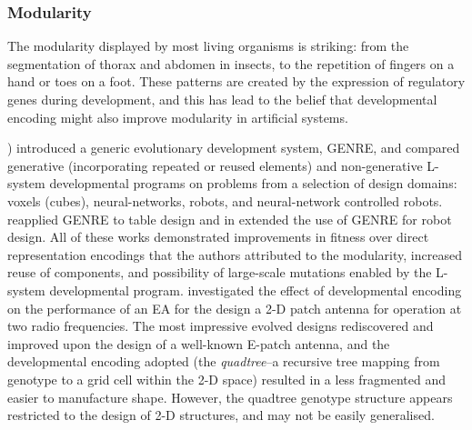 \subsubsection{Modularity}
The modularity displayed by most living organisms is striking: from the segmentation of thorax and abdomen in insects, to the repetition of fingers on a hand or toes on a foot.  These patterns are created by the expression of regulatory genes during development, and this has lead to the belief that developmental encoding might also improve modularity in artificial systems. 

\cite{Hornby:2003jt}) introduced a generic evolutionary development system, GENRE, and compared generative (incorporating repeated or reused elements) and non-generative L-system developmental programs on problems from a selection of design domains: voxels (cubes), neural-networks, robots, and neural-network controlled robots.  \cite{Hornby:2005rw} reapplied GENRE to table design and in \cite{Hornby:2006kj} extended the use of GENRE for robot design. All of these works demonstrated improvements in fitness over direct representation encodings that the authors attributed to the modularity, increased reuse of components, and possibility of large-scale mutations enabled by the L-system developmental program. \cite{Dorica:2007li} investigated the effect of developmental encoding on the performance of an EA for the design a 2-D patch antenna for operation at two radio frequencies. The most impressive evolved designs rediscovered and improved upon the design of a well-known E-patch antenna, and the developmental encoding adopted (the \emph{quadtree}--a recursive tree mapping from genotype to a grid cell within the 2-D space) resulted in a less fragmented and easier to manufacture shape. However, the quadtree genotype structure appears restricted to the design of 2-D structures, and may not be easily generalised.
